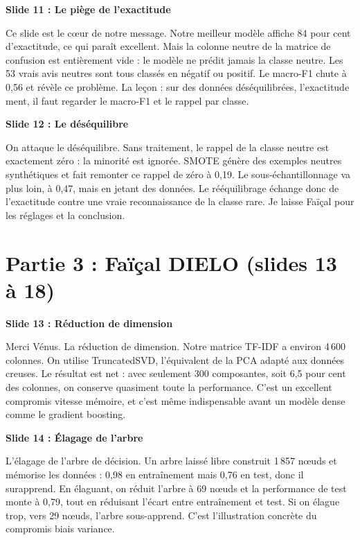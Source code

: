 \documentclass[11pt,a4paper]{article}
\newenvironment{turn}[2]%
{\begin{mdframed}[linewidth=0pt,backgroundcolor=panel,skipabove=6pt,skipbelow=6pt,
   innerleftmargin=10pt,innerrightmargin=10pt,innertopmargin=7pt,innerbottommargin=7pt,
   leftline=true,linecolor=#1,linewidth=3pt]%
 {\color{#1}\bfseries #2}\par\vspace{2pt}}
{\end{mdframed}}
\begin{document}
\begin{turn}{venus}{Slide 11 : Le piège de l'exactitude}
Ce slide est le cœur de notre message. Notre meilleur modèle affiche 84 pour cent
d'exactitude, ce qui paraît excellent. Mais la colonne neutre de la matrice de confusion
est entièrement vide : le modèle ne prédit jamais la classe neutre. Les 53 vrais avis
neutres sont tous classés en négatif ou positif. Le macro-F1 chute à 0,56 et révèle ce
problème. La leçon : sur des données déséquilibrées, l'exactitude ment, il faut regarder
le macro-F1 et le rappel par classe.
\end{turn}

\begin{turn}{venus}{Slide 12 : Le déséquilibre}
On attaque le déséquilibre. Sans traitement, le rappel de la classe neutre est exactement
zéro : la minorité est ignorée. SMOTE génère des exemples neutres synthétiques et fait
remonter ce rappel de zéro à 0,19. Le sous-échantillonnage va plus loin, à 0,47, mais en
jetant des données. Le rééquilibrage échange donc de l'exactitude contre une vraie
reconnaissance de la classe rare. Je laisse Faïçal pour les réglages et la conclusion.
\end{turn}

\section*{\textcolor{faical}{Partie 3 : Faïçal DIELO (slides 13 à 18)}}

\begin{turn}{faical}{Slide 13 : Réduction de dimension}
Merci Vénus. La réduction de dimension. Notre matrice TF-IDF a environ 4\,600 colonnes.
On utilise TruncatedSVD, l'équivalent de la PCA adapté aux données creuses. Le résultat
est net : avec seulement 300 composantes, soit 6,5 pour cent des colonnes, on conserve
quasiment toute la performance. C'est un excellent compromis vitesse mémoire, et c'est
même indispensable avant un modèle dense comme le gradient boosting.
\end{turn}

\begin{turn}{faical}{Slide 14 : Élagage de l'arbre}
L'élagage de l'arbre de décision. Un arbre laissé libre construit 1\,857 nœuds et
mémorise les données : 0,98 en entraînement mais 0,76 en test, donc il surapprend. En
élaguant, on réduit l'arbre à 69 nœuds et la performance de test monte à 0,79, tout en
réduisant l'écart entre entraînement et test. Si on élague trop, vers 29 nœuds, l'arbre
sous-apprend. C'est l'illustration concrète du compromis biais variance.
\end{turn}
\end{document}
